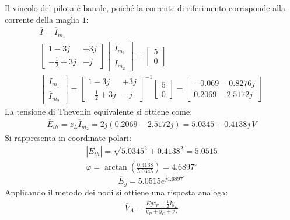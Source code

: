\documentclass{article}
\begin{document}
Il vincolo del pilota è banale, poiché la corrente di riferimento corrisponde alla corrente della maglia $1$:
\begin{gather*}
    \overline{I}=\overline{I}_{m_1}\\
    \begin{bmatrix}
        1-3j&+3j\\\displaystyle-\frac{1}{2}+3j&-j
    \end{bmatrix}\begin{bmatrix}
        \overline{I}_{m_1}\\\overline{I}_{m_2}
    \end{bmatrix}=\begin{bmatrix}
        5\\0
    \end{bmatrix}\\
    \begin{bmatrix}
        \overline{I}_{m_1}\\\overline{I}_{m_2}
    \end{bmatrix}=\begin{bmatrix}
        1-3j&+3j\\\displaystyle-\frac{1}{2}+3j&-j
    \end{bmatrix}^{-1}\begin{bmatrix}
        5\\0
    \end{bmatrix}=\begin{bmatrix}
        -0.069-0.8276j\\0.2069-2.5172j
    \end{bmatrix}
\end{gather*}
La tensione di Thevenin equivalente si ottiene come:
\begin{gather*}
    \overline{E}_{th}=z_L\overline{I}_{m_2}=2j(0.2069-2.5172j)=5.0345+0.4138j\,V
\end{gather*}
Si rappresenta in coordinate polari:
\begin{gather*}
    |\overline{E}_{th}|=\sqrt{5.0345^2+0.4138^2}=5.0515\\
    \varphi=\arctan\left(\displaystyle\frac{0.4138}{5.0345}\right)=4.6897^{\circ}
\end{gather*}
\begin{equation}
    \overline{E}_g=5.0515e^{j4.6897^{\circ}}
\end{equation}
Applicando il metodo dei nodi si ottiene una risposta analoga:
\begin{gather*}
    \overline{V}_A=\displaystyle\frac{\overline{E}gz_R-\frac{1}{2}\overline{I}y_L}{y_R+y_C+y_L}
\end{gather*}
\end{document}
